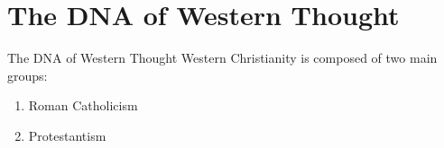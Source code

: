 \section{The DNA of Western Thought}
\begin{frame}{The DNA of Western Thought}{}
	Western Christianity is composed of two main groups:
	\begin{enumerate}
		\item Roman Catholicism
		\item Protestantism
	\end{enumerate}
\end{frame}
